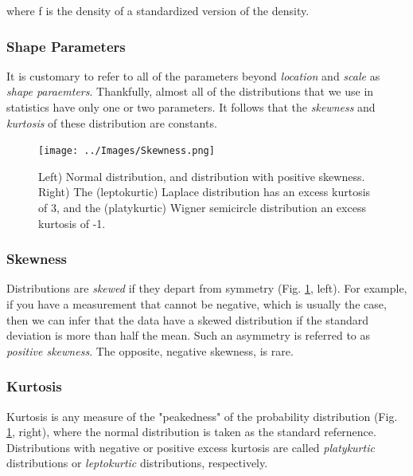 where f is the density of a standardized version of the density.

\subsubsection{Shape Parameters}

It is customary to refer to all of the parameters beyond \emph{location} and \emph{scale} as \emph{shape paraemters}. Thankfully, almost all of the distributions that we use in statistics have only one or two parameters. It follows that the \emph{skewness }and \emph{kurtosis} of these distribution are constants.

\begin{figure}
  \centering
  \texttt{[image: ../Images/Skewness.png]}\\
  \caption{Left) Normal distribution, and distribution with positive skewness. Right) The (leptokurtic) Laplace distribution has an excess kurtosis of 3, and the (platykurtic) Wigner semicircle distribution an excess kurtosis of -1.}\label{fig:skewkurtosis}
\end{figure}

\subsubsection{Skewness}

Distributions are \emph{skewed} if they depart from symmetry (Fig. \ref{fig:skewkurtosis}, left). For example, if you have a measurement that cannot be negative, which is usually the case, then we can infer that the data have a skewed distribution if the standard deviation is more than half the mean. Such an asymmetry is referred to as \emph{positive skewness}. The opposite, negative skewness, is rare.

\subsubsection{Kurtosis}

Kurtosis is any measure of the "peakedness" of the probability distribution (Fig. \ref{fig:skewkurtosis}, right), where the normal distribution is taken as the standard refernence. Distributions with negative or positive excess kurtosis are called \emph{platykurtic} distributions or \emph{leptokurtic} distributions, respectively.


